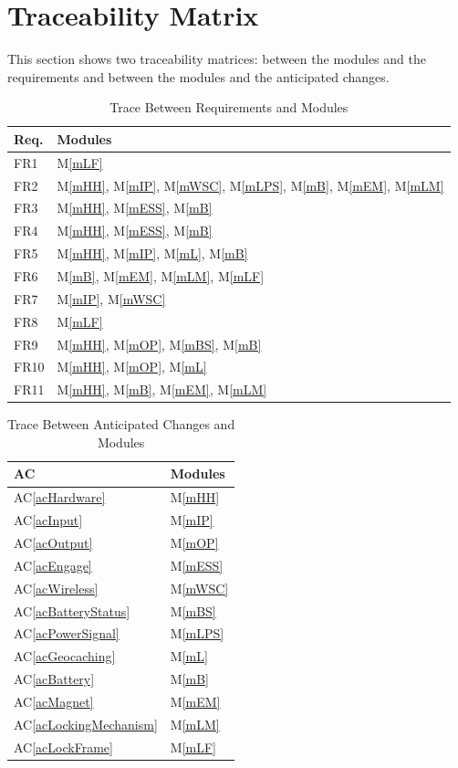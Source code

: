 \documentclass[12pt, titlepage]{article}
\newcommand{\acref}[1]{AC\ref{#1}}
\newcommand{\mref}[1]{M\ref{#1}}
\begin{document}
\section{Traceability Matrix} \label{SecTM}

This section shows two traceability matrices: between the modules and the
requirements and between the modules and the anticipated changes.

\begin{table}[H]
\centering
\begin{tabular}{p{} p{}}
\toprule
\textbf{Req.} & \textbf{Modules}\\
\midrule
FR1 & \mref{mLF}\\
FR2 & \mref{mHH}, \mref{mIP}, \mref{mWSC}, \mref{mLPS}, \mref{mB}, \mref{mEM}, \mref{mLM}\\
FR3 & \mref{mHH}, \mref{mESS}, \mref{mB}\\
FR4 & \mref{mHH}, \mref{mESS}, \mref{mB}\\
FR5 & \mref{mHH}, \mref{mIP}, \mref{mL}, \mref{mB}\\
FR6 & \mref{mB}, \mref{mEM}, \mref{mLM}, \mref{mLF}\\
FR7 & \mref{mIP}, \mref{mWSC}\\
FR8 & \mref{mLF}\\
FR9 & \mref{mHH}, \mref{mOP}, \mref{mBS}, \mref{mB}\\
FR10 & \mref{mHH}, \mref{mOP}, \mref{mL}\\
FR11 & \mref{mHH}, \mref{mB}, \mref{mEM}, \mref{mLM}\\
\bottomrule
\end{tabular}
\caption{Trace Between Requirements and Modules}
\label{TblRT}
\end{table}

\begin{table}[H]
\centering
\begin{tabular}{p{} p{}}
\toprule
\textbf{AC} & \textbf{Modules}\\
\midrule
\acref{acHardware} & \mref{mHH}\\
\acref{acInput} & \mref{mIP}\\
\acref{acOutput} & \mref{mOP}\\
\acref{acEngage} & \mref{mESS}\\
\acref{acWireless} & \mref{mWSC}\\
\acref{acBatteryStatus} & \mref{mBS}\\
\acref{acPowerSignal} & \mref{mLPS}\\
\acref{acGeocaching} & \mref{mL}\\
\acref{acBattery} & \mref{mB}\\
\acref{acMagnet} & \mref{mEM}\\
\acref{acLockingMechanism} & \mref{mLM}\\
\acref{acLockFrame} & \mref{mLF}\\
\bottomrule
\end{tabular}
\caption{Trace Between Anticipated Changes and Modules}
\label{TblACT}
\end{table}
\end{document}
